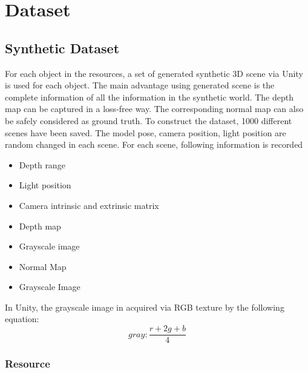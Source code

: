 
\chapter{Dataset} %

\label{ch:04} %







\section{Synthetic Dataset}
For each object in the resources, a set of generated synthetic 3D scene via Unity is used for each object.  The main advantage using generated scene is the complete information of all the information in the synthetic world. The depth map can be captured in a loss-free way. The corresponding normal map can also be safely considered as ground truth. To construct the dataset, 1000 different scenes have been saved. The model pose, camera position, light position are random changed in each scene.
For each scene, following information is recorded
\begin{itemize}
	\item Depth range
	\item Light position
	\item Camera intrinsic and extrinsic matrix
	\item Depth map
	\item Grayscale image
	\item Normal Map	
\end{itemize}



\begin{itemize}
	\item Grayscale Image
\end{itemize}

In Unity, the grayscale image in acquired via RGB texture by the following equation:
\[ gray: \frac{r+2g+b}{4}  \]

\subsection{Resource}


